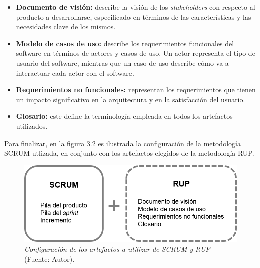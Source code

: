 		\begin{itemize}
			\item \textbf{Documento de visi\'{o}n: }describe la visi\'{o}n de los \textit{stakeholders} con respecto al producto a desarrollarse, especificado en t\'{e}rminos de las caracter\'{i}sticas y las necesidades clave de los mismos.
			
			\item \textbf{Modelo de casos de uso: }describe los requerimientos funcionales del software en t\'{e}rminos de actores y casos de uso. Un actor representa el tipo de usuario del software, mientras que un caso de uso describe c\'{o}mo va a interactuar cada actor con el software.
			
			\item \textbf{Requerimientos no funcionales: } representan los requerimientos que tienen un impacto significativo en la arquitectura y en la satisfacci\'{o}n del usuario.
			
			\item \textbf{Glosario: }este define la terminolog\'{i}a empleada en todos los artefactos utilizados.
		\end{itemize}

Para finalizar, en la figura 3.2 es ilustrada la configuraci\'{o}n de la metodolog\'{i}a SCRUM utlizada, en conjunto con los artefactos elegidos de la metodolog\'{i}a RUP.
	
	\FloatBarrier
	\begin{figure}[h]
		\centering
		\includegraphics[scale=0.8]{img/SCRUM-RUP.png}
			\caption[Configuraci\'{o}n de los artefactos a utilizar de SCRUM y RUP]{\textit{Configuraci\'{o}n de los artefactos a utilizar de SCRUM y RUP} (Fuente: Autor).}
	\end{figure}
	\FloatBarrier
	